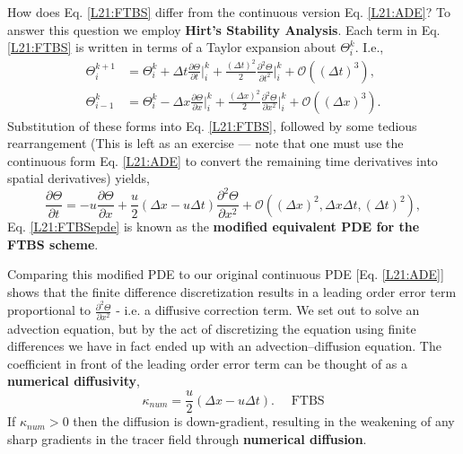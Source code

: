 How does Eq. \eqref{L21:FTBS} differ from the continuous version
Eq. \eqref{L21:ADE}? To answer this question we employ \textbf{Hirt's
  Stability Analysis}. Each term in Eq. \eqref{L21:FTBS} is written in
terms of a Taylor expansion about $\Theta_i^k$. I.e.,
\begin{align}
  \Theta_i^{k+1} &= \Theta_i^k+\Delta t\frac{\partial\Theta}{\partial
  t}\Big|_i^k+\frac{(\Delta t)^2}{2}\frac{\partial^2\Theta}{\partial
  t^2}\Big|_i^k + \mathcal{O}((\Delta t)^3), \\
  \Theta_{i-1}^k &= \Theta_i^k-\Delta x\frac{\partial\Theta}{\partial
  x}\Big|_i^k+\frac{(\Delta x)^2}{2}\frac{\partial^2\Theta}{\partial
  x^2}\Big|_i^k + \mathcal{O}((\Delta x)^3).
\end{align}
Substitution of these forms into Eq. \eqref{L21:FTBS}, followed by
some tedious rearrangement (This is left as an exercise --- note that one must use the continuous form Eq. \eqref{L21:ADE} to convert the remaining
time derivatives into spatial derivatives) yields,
\begin{equation}
  \frac{\partial\Theta}{\partial t} = -u
  \frac{\partial\Theta}{\partial x} + \frac{u}{2}\left(\Delta
    x-u\Delta t\right)\frac{\partial^2\Theta}{\partial x^2} +
  \mathcal{O}\left((\Delta x)^2,\Delta x\Delta t,(\Delta t)^2\right),\label{L21:FTBSepde}
\end{equation}
Eq. \eqref{L21:FTBSepde} is known as the \textbf{modified equivalent
  PDE for the FTBS scheme}.

Comparing this modified PDE to our original continuous PDE
[Eq. \eqref{L21:ADE}] shows that the finite difference discretization
results in a leading order error term proportional to
$\frac{\partial^2\Theta}{\partial x^2}$ - i.e. a diffusive correction
term.  We set out to solve an advection equation, but by the act of
discretizing the equation using finite differences we have in fact
ended up with an advection--diffusion equation. The coefficient in
front of the leading order error term can be thought of as a
\textbf{numerical diffusivity},
\begin{equation}
  \kappa_{num} = \frac{u}{2}\left(\Delta x-u\Delta t\right).\quad\text{ FTBS}\label{L21:FTBSKnum}
\end{equation}
If $\kappa_{num}>0$ then the diffusion is down-gradient, resulting in
the weakening of any sharp gradients in the tracer field through
\textbf{numerical diffusion}. 

